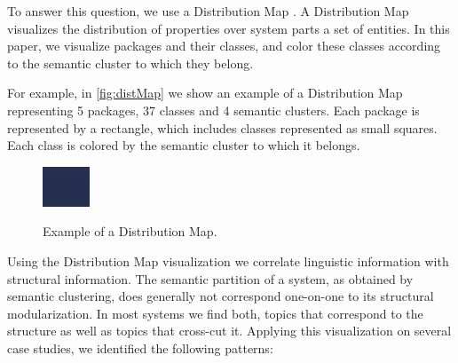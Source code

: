 \documentclass[10pt]{book}
\begin{document}
To answer this question, we use a Distribution Map \cite{Tuft01a,Duca06c}. A Distribution Map visualizes the distribution of properties over system parts \ie a set of entities. In this paper, we visualize packages and their classes, and color these classes according to the semantic cluster to which they belong.

For example, in \autoref{fig:distMap} we show an example of a Distribution Map representing 5 packages, 37 classes and 4 semantic clusters. Each package is represented by a rectangle, which includes classes represented as small squares. Each class is colored by the semantic cluster to which it belongs.

\begin{figure}[h]
    \centering
  \includegraphics{MetricExamples}\\
  \caption{Example of a Distribution Map.}\label{fig:distMap}
\end{figure}

Using the Distribution Map visualization we correlate linguistic information with structural information. The semantic partition of a system, as obtained by semantic clustering, does generally not correspond one-on-one to its structural modularization. In most systems we find both, topics that correspond to the structure as well as topics that cross-cut it. Applying this visualization on several case studies, we identified the following patterns:
\end{document}
